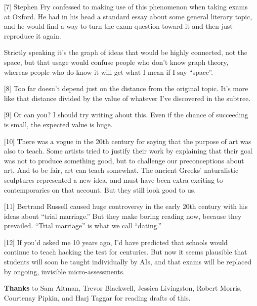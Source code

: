 {[}7{]} Stephen Fry confessed to making use of this phenomenon when
taking exams at Oxford. He had in his head a standard essay about some
general literary topic, and he would find a way to turn the exam
question toward it and then just reproduce it again.

Strictly speaking it's the graph of ideas that would be highly
connected, not the space, but that usage would confuse people who don't
know graph theory, whereas people who do know it will get what I mean if
I say ``space''.

{[}8{]} Too far doesn't depend just on the distance from the original
topic. It's more like that distance divided by the value of whatever
I've discovered in the subtree.

{[}9{]} Or can you? I should try writing about this. Even if the chance
of succeeding is small, the expected value is huge.

{[}10{]} There was a vogue in the 20th century for saying that the
purpose of art was also to teach. Some artists tried to justify their
work by explaining that their goal was not to produce something good,
but to challenge our preconceptions about art. And to be fair, art can
teach somewhat. The ancient Greeks' naturalistic sculptures represented
a new idea, and must have been extra exciting to contemporaries on that
account. But they still look good to us.

{[}11{]} Bertrand Russell caused huge controversy in the early 20th
century with his ideas about ``trial marriage.'' But they make boring
reading now, because they prevailed. ``Trial marriage'' is what we call
``dating.''

{[}12{]} If you'd asked me 10 years ago, I'd have predicted that schools
would continue to teach hacking the test for centuries. But now it seems
plausible that students will soon be taught individually by AIs, and
that exams will be replaced by ongoing, invisible micro-assessments.

\textbf{Thanks} to Sam Altman, Trevor Blackwell, Jessica Livingston,
Robert Morris, Courtenay Pipkin, and Harj Taggar for reading drafts of
this.

